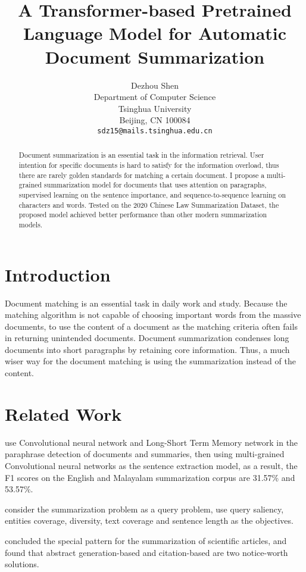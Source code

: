 \documentclass[11pt,a4paper]{article}
\title{A Transformer-based Pretrained Language Model for Automatic Document Summarization}
\author{Dezhou Shen \\
  Department of Computer Science\\
  Tsinghua University\\
  Beijing, CN 100084\\
  \texttt{sdz15@mails.tsinghua.edu.cn} \\}
\date{}
\begin{document}
\maketitle
\begin{abstract}
 Document summarization is an essential task in the information retrieval.
 User intention for specific documents is hard to satisfy for the information overload,
 thus there are rarely golden standards for matching a certain document.
 I propose a multi-grained summarization model for documents that uses attention on paragraphs,
 supervised learning on the sentence importance, and sequence-to-sequence learning on characters and words.
 Tested on the 2020 Chinese Law Summarization Dataset, the proposed model achieved
 better performance than other modern summarization models.
\end{abstract}

\section{Introduction}

Document matching is an essential task in daily work and study.
Because the matching algorithm is not capable of choosing important words from the massive documents,
to use the content of a document as the matching criteria often fails in returning unintended documents.
Document summarization condenses long documents into short paragraphs by retaining core information.
Thus, a much wiser way for the document matching is using the summarization instead of the content.

\section{Related Work}

\citet{bhargava2020deep} use Convolutional neural network and Long-Short Term Memory network in the paraphrase detection of
documents and summaries, then using multi-grained Convolutional neural networks as the sentence extraction model,
as a result, the F1 scores on the English and Malayalam summarization corpus are 31.57\% and 53.57\%.

\citet{erera2019summarization} consider the summarization problem as a query problem, use query
saliency, entities coverage, diversity, text coverage and sentence length as the objectives.

\citet{altmami2020automatic} concluded the special pattern for the summarization of scientific articles,
and found that abstract generation-based and citation-based are two notice-worth solutions.
\end{document}
